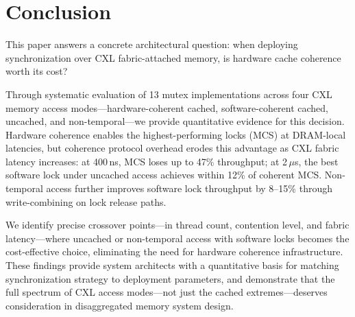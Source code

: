 \section{Conclusion}

This paper answers a concrete architectural question: when deploying synchronization over CXL fabric-attached memory, is hardware cache coherence worth its cost?

Through systematic evaluation of 13 mutex implementations across four CXL memory access modes---hardware-coherent cached, software-coherent cached, uncached, and non-temporal---we provide quantitative evidence for this decision.
Hardware coherence enables the highest-performing locks (MCS) at DRAM-local latencies, but coherence protocol overhead erodes this advantage as CXL fabric latency increases: at 400\,ns, MCS loses up to 47\% throughput; at 2\,$\mu$s, the best software lock under uncached access achieves within 12\% of coherent MCS.
Non-temporal access further improves software lock throughput by 8--15\% through write-combining on lock release paths.

We identify precise crossover points---in thread count, contention level, and fabric latency---where uncached or non-temporal access with software locks becomes the cost-effective choice, eliminating the need for hardware coherence infrastructure.
These findings provide system architects with a quantitative basis for matching synchronization strategy to deployment parameters, and demonstrate that the full spectrum of CXL access modes---not just the cached extremes---deserves consideration in disaggregated memory system design.
